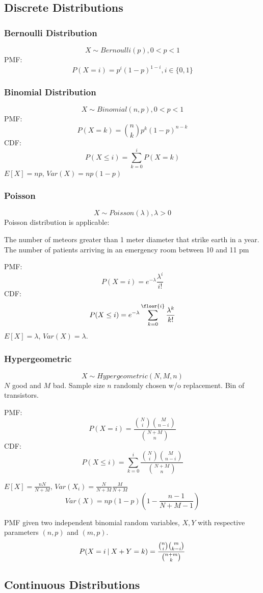\subsection{Discrete Distributions}
\subsubsection{Bernoulli Distribution}
$$X\sim Bernoulli(p), 0 < p < 1$$
PMF:
$$P(X = i) = p^i(1-p)^{1-i}, i \in \{0,1\}$$
\subsubsection{Binomial Distribution}
$$X\sim Binomial(n, p), 0 < p < 1$$
PMF:
$$P(X = k) = \binom{n}{k}p^k(1-p)^{n-k}$$
CDF:
$$P(X \leq i) = \sum_{k=0}^i P(X=k)$$
$E[X] = np$,
$Var(X) = np(1-p)$
\subsubsection{Poisson}
$$X\sim Poisson(\lambda), \lambda > 0$$
Poisson distribution is applicable:

The number of meteors greater than 1 meter diameter that strike earth in a year.
The number of patients arriving in an emergency room between 10 and 11 pm

PMF:
$$P(X=i) = e^{-\lambda}\frac{\lambda^i}{i!}$$
CDF:
$$P(X\leq i) = e^{-\lambda} \sum_{k=0}^{\floor{i}} \frac{\lambda^k}{k!}$$
$E[X] = \lambda$, $Var(X) = \lambda$.

\subsubsection{Hypergeometric}
$$X \sim Hypergeometric(N, M, n)$$
$N$ good and $M$ bad.
Sample size $n$ randomly chosen w/o replacement.
Bin of transistors.

PMF:
$$P(X=i) = \frac{\binom{N}{i}\binom{M}{n-i}}{\binom{N+M}{n}}$$
CDF:
$$P(X\leq i) = \sum_{k=0}^i \frac{\binom{N}{i}\binom{M}{n-i}}{\binom{N+M}{n}}$$

$E[X] = \frac{nN}{N+M}$, $Var(X_i) = \frac{N}{N+M} \frac{M}{N+M}$
$$Var(X) = np(1-p)\left(1-\frac{n-1}{N+M-1}\right)$$

PMF given two independent binomial random variables, $X, Y$ with respective
parameters $(n,p)$ and $(m,p)$.
$$P(X=i\:\vert\: X+Y=k) = \frac{\binom{n}{i}\binom{m}{k-i}}{\binom{n+m}{k}}$$

\subsection{Continuous Distributions}

